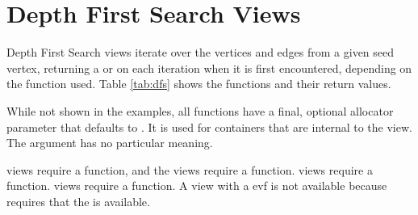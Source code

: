 \section{Depth First Search Views}
Depth First Search views iterate over the vertices and edges from a given seed vertex, returning a  or  on each iteration when it is first encountered, depending on the function used. 
Table \ref{tab:dfs} shows the functions and their return values.

While not shown in the examples, all functions have a final, optional allocator parameter that defaults to . 
It is used for containers that are internal to the view. The  argument has no particular meaning.

 views require a  function, and the  views require a  function.
 views require a  function.  views require a  function. 
A  view with a evf is not available because  requires that the  is available.


